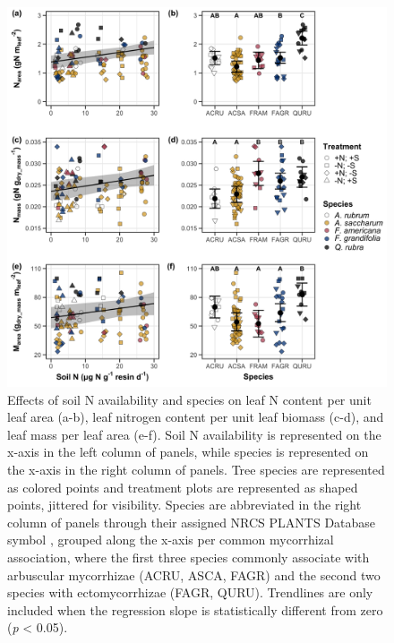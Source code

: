     \newpage
    \begin{figure}
        \includegraphics[width=\textwidth]{ch3_NxpH/figs/NxS_fig1_leafn.png}
        \centering
        \caption[Effects of soil N availability and species on leaf N content per unit leaf area, leaf nitrogen content per unit leaf biomass, and leaf mass per leaf area]{Effects of soil N availability and species on leaf N content per unit leaf area (a-b), leaf nitrogen content per unit leaf biomass (c-d), and leaf mass per leaf area (e-f). Soil N availability is represented on the x-axis in the left column of panels, while species is represented on the x-axis in the right column of panels. Tree species are represented as colored points and treatment plots are represented as shaped points, jittered for visibility. Species are abbreviated in the right column of panels through their assigned NRCS PLANTS Database symbol , grouped along the x-axis per common mycorrhizal association, where the first three species commonly associate with arbuscular mycorrhizae (ACRU, ASCA, FAGR) and the second two species with ectomycorrhizae (FAGR, QURU). Trendlines are only included when the regression slope is statistically different from zero (\textit{p} < 0.05).}
        \label{fig:figure3.1}
    \end{figure}
    \clearpage

